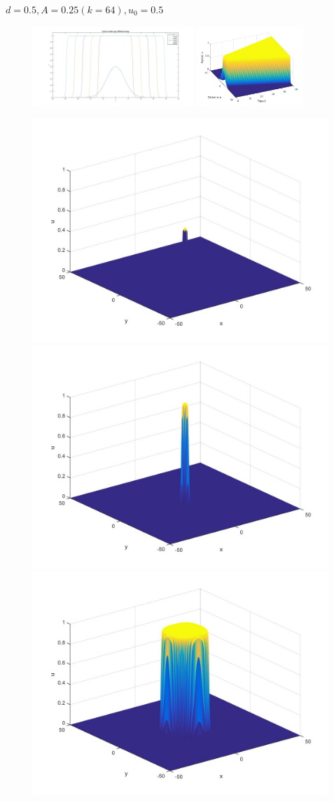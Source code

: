 \documentclass[10pt]{beamer}
\begin{document}
\begin{frame}{$\ d=0.5, A=0.25 (k=64), u_0=0.5$}{}
\begin{figure}[H]
	\centering
	\includegraphics[width=0.40\linewidth, height=3cm]{Allee/F2312}\hfill
	\includegraphics[width=0.55\linewidth, height=3cm]{Allee/F4312}
\end{figure}
\begin{figure}[H]
	\centering
	\includegraphics[width=0.3\linewidth]{Allee/312__1_}\hfill
    \includegraphics[width=0.3\linewidth]{Allee/312__2_}\hfill
	\includegraphics[width=0.3\linewidth]{Allee/312__3_}
\end{figure}
\end{frame}
\end{document}
